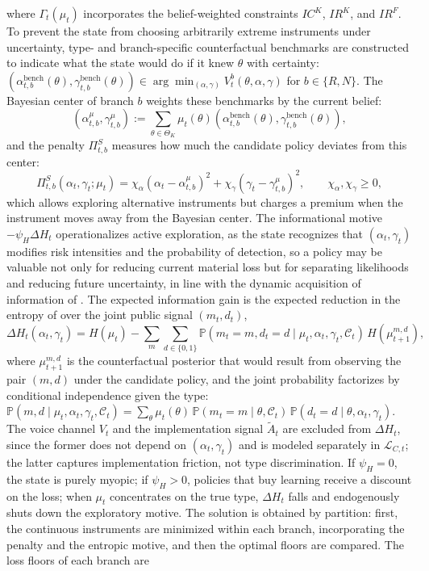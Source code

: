 \documentclass[pdflatex,sn-mathphys-ay]{sn-jnl}
\theoremstyle{plain}
\theoremstyle{definition}
\newcommand{\Prob}{\mathbb{P}}
\newcommand{\ThetaK}{\Theta_K}
\newcommand{\1}{\mathbf{1}}
\begin{document}
where $\Gamma_t(\mu_t)$ incorporates the belief-weighted constraints $IC^K$, $IR^K$, and $IR^F$. To prevent the state from choosing arbitrarily extreme instruments under uncertainty, type- and branch-specific counterfactual benchmarks are constructed to indicate what the state would do if it knew $\theta$ with certainty: $(\alpha_{t,b}^{\mathrm{bench}}(\theta),\gamma_{t,b}^{\mathrm{bench}}(\theta)) \allowbreak \in \allowbreak \arg\min_{(\alpha,\gamma)}V_t^b(\theta,\alpha,\gamma)$ for $b\in\{R,N\}$. The Bayesian center of branch $b$ weights these benchmarks by the current belief:
\[
(\alpha_{t,b}^{\mu},\gamma_{t,b}^{\mu}):=\sum_{\theta\in\ThetaK}\mu_t(\theta)(\alpha_{t,b}^{\mathrm{bench}}(\theta),\gamma_{t,b}^{\mathrm{bench}}(\theta)),
\]
and the penalty $\Pi_{t,b}^S$ measures how much the candidate policy deviates from this center:
\begin{equation}
\Pi_{t,b}^S(\alpha_t,\gamma_t;\mu_t)=\chi_\alpha(\alpha_t-\alpha_{t,b}^{\mu})^2+\chi_\gamma(\gamma_t-\gamma_{t,b}^{\mu})^2,\qquad\chi_\alpha,\chi_\gamma\ge 0,
\label{eq:prima-desviacion}
\end{equation}
which allows exploring alternative instruments but charges a premium when the instrument moves away from the Bayesian center. The informational motive $-\psi_H\Delta H_t$ operationalizes active exploration, as the state recognizes that $(\alpha_t,\gamma_t)$ modifies risk intensities and the probability of detection, so a policy may be valuable not only for reducing current material loss but for separating likelihoods and reducing future uncertainty, in line with the dynamic acquisition of information of \citet{Zhong2022}. The expected information gain is the expected reduction in the entropy of \citet{Shannon1948} over the joint public signal $(m_t,d_t)$,
\begin{equation}
\Delta H_t(\alpha_t,\gamma_t)=H(\mu_t)-\sum_{m}\sum_{d\in\{0,1\}}\Prob(m_t=m,d_t=d\mid\mu_t,\alpha_t,\gamma_t,\mathcal{C}_t)\,H(\mu_{t+1}^{m,d}),
\label{eq:delta-H}
\end{equation}
where $\mu_{t+1}^{m,d}$ is the counterfactual posterior that would result from observing the pair $(m,d)$ under the candidate policy, and the joint probability factorizes by conditional independence given the type: $\Prob(m,d\mid\mu_t,\alpha_t,\gamma_t,\mathcal{C}_t)=\sum_{\theta}\mu_t(\theta)\,\Prob(m_t=m\mid\theta,\mathcal{C}_t)\,\Prob(d_t=d\mid\theta,\alpha_t,\gamma_t)$. The voice channel $V_t$ and the implementation signal $\tilde{A}_t$ are excluded from $\Delta H_t$, since the former does not depend on $(\alpha_t,\gamma_t)$ and is modeled separately in $\mathcal{L}_{C,t}$; the latter captures implementation friction, not type discrimination. If $\psi_H=0$, the state is purely myopic; if $\psi_H>0$, policies that buy learning receive a discount on the loss; when $\mu_t$ concentrates on the true type, $\Delta H_t$ falls and endogenously shuts down the exploratory motive. The solution is obtained by partition: first, the continuous instruments are minimized within each branch, incorporating the penalty and the entropic motive, and then the optimal floors are compared. The loss floors of each branch are
\end{document}
